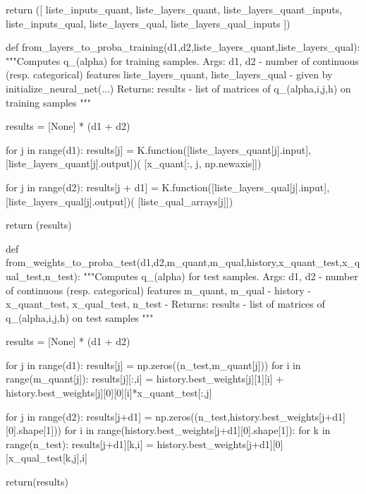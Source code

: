 \begin{pylisting}
        return ([
            liste_inputs_quant, liste_layers_quant, liste_layers_quant_inputs,
            liste_inputs_qual, liste_layers_qual, liste_layers_qual_inputs
        ])
    
    
    def from_layers_to_proba_training(d1,d2,liste_layers_quant,liste_layers_qual):
        """Computes q_(alpha) for training samples.
	    Args:
	       d1, d2 - number of continuous (resp. categorical) features
	       liste_layers_quant, liste_layers_qual - given by initialize_neural_net(...)
	    Returns:
			results - list of matrices of q_(alpha,i,j,h) on training samples
	    """

        results = [None] * (d1 + d2)

        for j in range(d1):
            results[j] = K.function([liste_layers_quant[j].input],
                                    [liste_layers_quant[j].output])(
                                        [x_quant[:, j, np.newaxis]])

        for j in range(d2):
            results[j + d1] = K.function([liste_layers_qual[j].input],
                                         [liste_layers_qual[j].output])(
                                             [liste_qual_arrays[j]])

        return (results)
    
    
    
    
    def from_weights_to_proba_test(d1,d2,m_quant,m_qual,history,x_quant_test,x_qual_test,n_test):
        """Computes q_(alpha) for test samples.
	    Args:
	       d1, d2 - number of continuous (resp. categorical) features
	       m_quant, m_qual - 
	       history - 
	       x_quant_test, x_qual_test, n_test - 
	    Returns:
			results - list of matrices of q_(alpha,i,j,h) on test samples
	    """
	    
        results = [None] * (d1 + d2)    

        for j in range(d1):
            results[j] = np.zeros((n_test,m_quant[j]))
            for i in range(m_quant[j]):
                results[j][:,i] = history.best_weights[j][1][i] + history.best_weights[j][0][0][i]*x_quant_test[:,j]


        for j in range(d2):
            results[j+d1] = np.zeros((n_test,history.best_weights[j+d1][0].shape[1]))
            for i in range(history.best_weights[j+d1][0].shape[1]):
                for k in range(n_test):
                    results[j+d1][k,i] = history.best_weights[j+d1][0][x_qual_test[k,j],i]

        return(results)
    

\end{pylisting}
